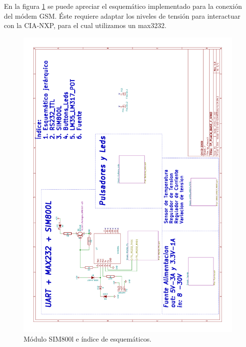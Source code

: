 En la figura \ref{fig:essim800} se puede apreciar el esquemático implementado para la conexión del módem GSM. Éste requiere adaptar los niveles de tensión para interactuar con la CIA-NXP, para el cual utilizamos un max3232.
\begin{figure}[!htb]
  \centering
  \includegraphics[page=1,scale=0.3,angle=270]{./Figures/schematic.pdf}
  \caption{Módulo SIM800l e índice de esquemáticos.}
  \label{fig:essim800}
\end{figure}

